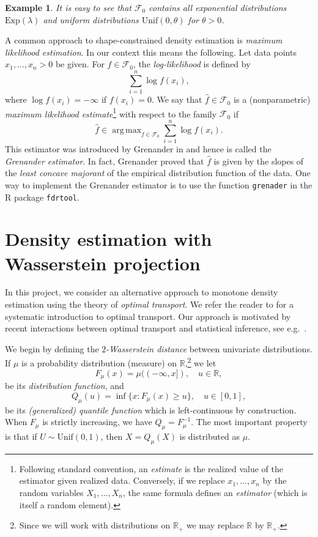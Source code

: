 \documentclass{article}
\DeclareMathOperator*{\argmax}{arg\,max}
\newcommand{\bR}{\mathbb{R}}
\newcommand{\cF}{\mathcal{F}}
\numberwithin{equation}{section}
\newtheorem{example}{Example}
\begin{document}
\begin{example}
It is easy to see that $\cF_0$ contains all exponential distributions $\mathrm{Exp}(\lambda)$ and uniform distributions $\mathrm{Unif}(0, \theta)$ for $\theta > 0$.
\end{example}

A common approach to shape-constrained density estimation is {\it maximum likelihood estimation}. In our context this means the following. Let data points $x_1, \ldots, x_n > 0$ be given. For $f \in \cF_0$, the {\it log-likelihood} is defined by
\[
\sum_{i = 1}^n \log f(x_i),
\]
where $\log f(x_i) = -\infty$ if $f(x_i) = 0$. We say that $\hat{f} \in \cF_0$ is a (nonparametric) {\it maximum likelihood estimate}\footnote{Following standard convention, an {\it estimate} is the realized value of the estimator given realized data. Conversely, if we replace $x_1, \ldots, x_n$ by the random variables $X_1, \ldots, X_n$, the same formula defines an {\it estimator} (which is itself a random element).} with respect to the family $\cF_0$ if
\begin{equation} \label{eqn:MLE}
\hat{f} \in \argmax_{f \in \cF_0} \sum_{i = 1}^n \log f(x_i).
\end{equation}
This estimator was introduced by Grenander in \cite{G56} and hence is called the {\it Grenander estimator}. In fact, Grenander proved that $\hat{f}$ is given by the slopes of the {\it least concave majorant} of the empirical distribution function of the data. One way to implement the Grenander estimator is to use the function \texttt{grenader} in the R package \texttt{fdrtool}.

\section{Density estimation with Wasserstein projection}
In this project, we consider an alternative approach to monotone density estimation using the theory of {\it optimal transport}. We refer the reader to \cite{S15} for a systematic introduction to optimal transport. Our approach is motivated by recent interactions between optimal transport and statistical inference, see e.g.~\cite{AM22, PZ20}.

We begin by defining the {\it $2$-Wasserstein distance} between univariate distributions. If $\mu$ is a probability distribution (measure) on $\bR$,\footnote{Since we will work with distributions on $\bR_+$ we may replace $\bR$ by $\bR_+$.} we let
\[
F_{\mu}(x) = \mu((-\infty, x]), \quad u \in \bR,
\]
be its {\it distribution function}, and
\[
Q_{\mu}(u) = \inf\{ x : F_{\mu}(x) \geq u \}, \quad u \in [0, 1],
\]
be its {\it (generalized) quantile function} which is left-continuous by construction. When $F_{\mu}$ is strictly increasing, we have $Q_{\mu} = F_{\mu}^{-1}$. The most important property is that if $U \sim \mathrm{Unif}(0, 1)$, then $X = Q_{\mu}(X)$ is distributed as $\mu$. 
\end{document}
